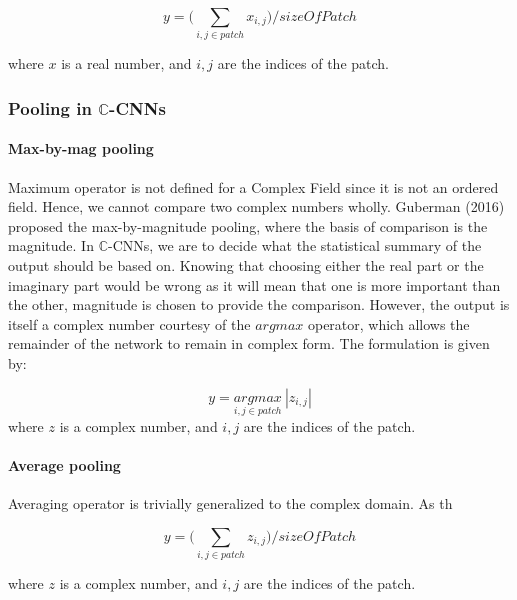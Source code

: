  \begin{equation}
 y = \bigg(\underset{i,j \in patch}{\sum} x_{i,j} \bigg)/ sizeOfPatch
 \end{equation}
 
 where $x$ is a real number, and $i,j$ are the indices of the patch.
 \subsubsection{Pooling in $\mathbb{C}$-CNNs}
 \paragraph{Max-by-mag pooling}
 Maximum operator is not defined for a Complex Field since it is not an ordered field. Hence, we cannot compare two complex numbers wholly. Guberman (2016) \cite{Guberman} proposed the max-by-magnitude pooling, where the basis of comparison is the magnitude. In $\mathbb{C}$-CNNs, we are to decide what the statistical summary of the output should be based on. Knowing that choosing either the real part or the imaginary part would be wrong as it will mean that one is more important than the other, magnitude is chosen to provide the comparison. However, the output is itself a complex number courtesy of the $argmax$ operator, which allows the remainder of the network to remain in complex form. The formulation is given by:
 

 
\begin{equation}
y = \underset{i,j \in patch}{argmax} \ |z_{i,j}|
\end{equation}
 where $z$ is a complex number, and $i,j$ are the indices of the patch.
\paragraph{Average pooling}
Averaging operator is trivially generalized to the complex domain. As th  
 
 
  \begin{equation}
 y = \bigg(\underset{i,j \in patch}{\sum} z_{i,j} \bigg)/ sizeOfPatch
 \end{equation}
 
 where $z$ is a complex number, and $i,j$ are the indices of the patch.
 
